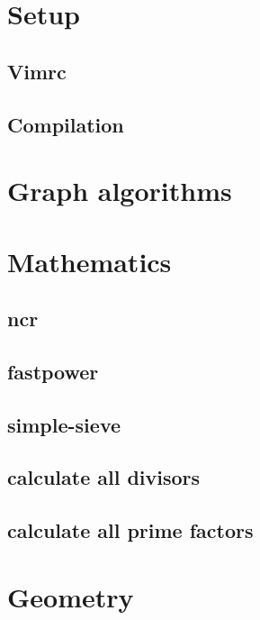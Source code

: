 \section{Setup}
\subsection{Vimrc}
\raggedbottom
\hrulefill
\subsection{Compilation}
\raggedbottom
\hrulefill


\section{Graph algorithms}


\section{Mathematics}
\subsection{ncr}
\raggedbottom
\hrulefill
\subsection{fastpower}
\raggedbottom
\hrulefill
\subsection{simple-sieve}
\raggedbottom
\hrulefill
\subsection{calculate all divisors}
\raggedbottom
\hrulefill
\subsection{calculate all prime factors}
\raggedbottom
\hrulefill

\section{Geometry}

